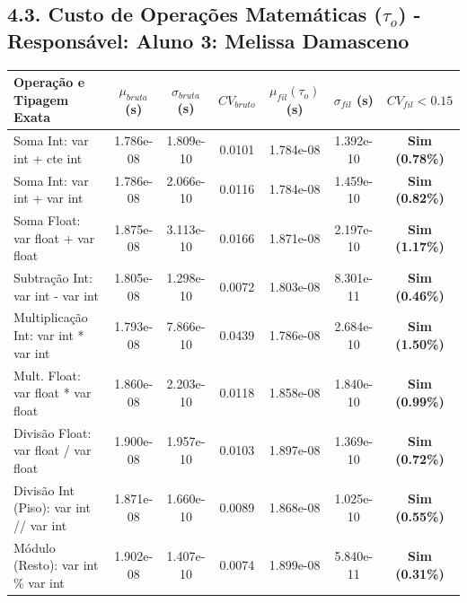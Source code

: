 \documentclass[10pt,a4paper]{article}
\begin{document}
\subsection{4.3. Custo de Operações Matemáticas ($\tau_o$) - Responsável: Aluno 3: Melissa Damasceno}
\begin{table}[H]
\centering\small
\begin{tabularx}{\textwidth}{Xcccccc}
\toprule
\textbf{Operação e Tipagem Exata} & $\mu_{bruta}$ (s) & $\sigma_{bruta}$ (s) & $CV_{bruto}$ & $\mu_{fil} (\tau_o)$ (s) & $\sigma_{fil}$ (s) & $CV_{fil} < 0.15$ \\ \midrule
Soma Int: var int + cte int & 1.786e-08 & 1.809e-10 & 0.0101 & 1.784e-08 & 1.392e-10 & \textbf{Sim (0.78\%)} \\
Soma Int: var int + var int & 1.786e-08 & 2.066e-10 & 0.0116 & 1.784e-08 & 1.459e-10 & \textbf{Sim (0.82\%)} \\
Soma Float: var float + var float & 1.875e-08 & 3.113e-10 & 0.0166 & 1.871e-08 & 2.197e-10 & \textbf{Sim (1.17\%)} \\
Subtração Int: var int - var int & 1.805e-08 & 1.298e-10 & 0.0072 & 1.803e-08 & 8.301e-11 & \textbf{Sim (0.46\%)} \\
Multiplicação Int: var int * var int & 1.793e-08 & 7.866e-10 & 0.0439 & 1.786e-08 & 2.684e-10 & \textbf{Sim (1.50\%)} \\
Mult. Float: var float * var float & 1.860e-08 & 2.203e-10 & 0.0118 & 1.858e-08 & 1.840e-10 & \textbf{Sim (0.99\%)} \\
Divisão Float: var float / var float & 1.900e-08 & 1.957e-10 & 0.0103 & 1.897e-08 & 1.369e-10 & \textbf{Sim (0.72\%)} \\
Divisão Int (Piso): var int // var int & 1.871e-08 & 1.660e-10 & 0.0089 & 1.868e-08 & 1.025e-10 & \textbf{Sim (0.55\%)} \\
Módulo (Resto): var int \% var int & 1.902e-08 & 1.407e-10 & 0.0074 & 1.899e-08 & 5.840e-11 & \textbf{Sim (0.31\%)} \\
\bottomrule
\end{tabularx}
\end{table}
\end{document}
